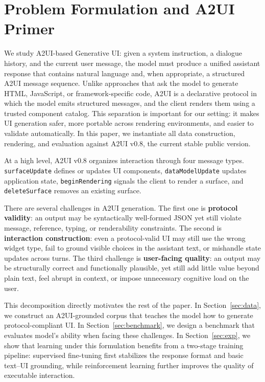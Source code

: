 
\section{Problem Formulation and A2UI Primer}
\label{sec:problem}

We study A2UI-based Generative UI: given a system instruction, a dialogue history, and the current user message, the model must produce a unified assistant response that contains natural language and, when appropriate, a structured A2UI message sequence. Unlike approaches that ask the model to generate HTML, JavaScript, or framework-specific code, A2UI is a declarative protocol in which the model emits structured messages, and the client renders them using a trusted component catalog. This separation is important for our setting: it makes UI generation safer, more portable across rendering environments, and easier to validate automatically. In this paper, we instantiate all data construction, rendering, and evaluation against A2UI v0.8, the current stable public version.

At a high level, A2UI v0.8 organizes interaction through four message types. \texttt{surfaceUpdate} defines or updates UI components, \texttt{dataModelUpdate} updates application state, \texttt{beginRendering} signals the client to render a surface, and \texttt{deleteSurface} removes an existing surface. 

There are several challenges in A2UI generation. The first one is \textbf{protocol validity}: an output may be syntactically well-formed JSON yet still violate message, reference, typing, or renderability constraints. The second is \textbf{interaction construction}: even a protocol-valid UI may still use the wrong widget type, fail to ground visible choices in the assistant text, or mishandle state updates across turns. The third challenge is \textbf{user-facing quality}: an output may be structurally correct and functionally plausible, yet still add little value beyond plain text, feel abrupt in context, or impose unnecessary cognitive load on the user.

This decomposition directly motivates the rest of the paper. In Section~\ref{sec:data}, we construct an A2UI-grounded corpus that teaches the model how to generate protocol-compliant UI. In Section~\ref{sec:benchmark}, we design a benchmark that evaluates model's ability when facing these challenges. In Section~\ref{sec:exp}, we show that learning under this formulation benefits from a two-stage training pipeline: supervised fine-tuning first stabilizes the response format and basic text--UI grounding, while reinforcement learning further improves the quality of executable interaction.